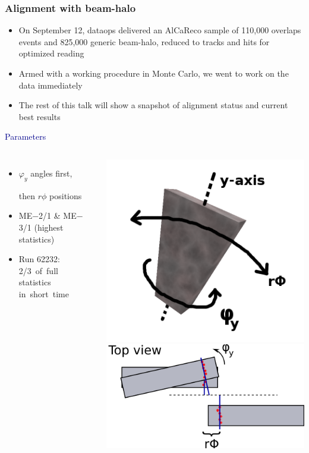 \documentclass[compress]{beamer}
\begin{document}
\begin{frame}
\frametitle{Alignment with beam-halo}
\small

\begin{itemize}
\item On September 12, dataops delivered an AlCaReco sample of 110,000
  overlaps events and 825,000 generic beam-halo, reduced to tracks and
  hits for optimized reading
\item Armed with a working procedure in Monte Carlo, we went to work
  on the data immediately
\item The rest of this talk will show a snapshot of alignment status
  and current best results
\end{itemize}

\vfill
\hspace{-0.83 cm} \textcolor{darkblue}{\Large Parameters}

\vspace{0.2 cm}
\begin{columns}
\begin{itemize}
\item $\varphi_y$ angles first,

then $r\phi$ positions
\item ME$-$2/1 \& ME$-$3/1 (highest statistics)
\item Run 62232: \mbox{2/3 of full \hspace{-0.5 cm}} statistics \mbox{in short time\hspace{-1 cm}}
\end{itemize}

\includegraphics[width=0.38\linewidth]{one_chamber.png} \includegraphics[width=0.62\linewidth]{order_of_parameters.png}
\end{columns}

\end{frame}
\end{document}
